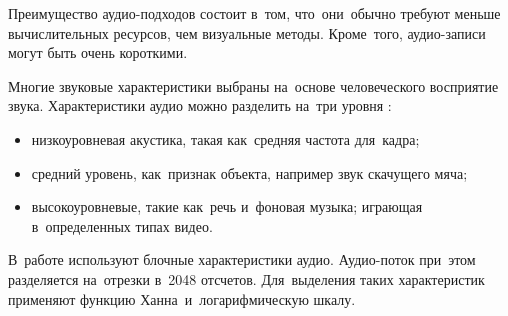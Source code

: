 Преимущество аудио-подходов состоит в~том,
что~они~обычно требуют меньше вычислительных ресурсов, чем визуальные методы.
Кроме~того, аудио-записи могут быть очень короткими.

Многие звуковые характеристики выбраны на~основе человеческого восприятие звука.
Характеристики аудио можно разделить на~три уровня \cite{Chen:2008}:
\begin{itemize}
    \item низкоуровневая акустика, такая как~средняя частота для~кадра;
    \item средний уровень, как~признак объекта, например звук скачущего мяча;
    \item высокоуровневые, такие как~речь и~фоновая музыка;
        играющая в~определенных типах видео.
\end{itemize}


В~работе \cite{Seyerlehner:2010} используют блочные характеристики аудио.
Аудио-поток при~этом разделяется на~отрезки в~2048 отсчетов.
Для~выделения таких характеристик применяют функцию Ханна\
и~логарифмическую шкалу.















